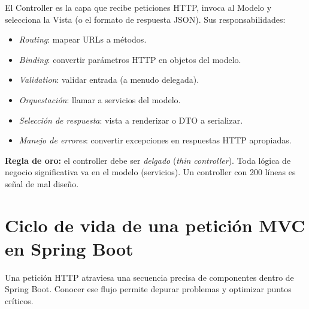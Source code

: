 El Controller es la capa que recibe peticiones HTTP, invoca al Modelo
y selecciona la Vista (o el formato de respuesta JSON). Sus
responsabilidades:

\begin{itemize}
\item \emph{Routing}: mapear URLs a métodos.
\item \emph{Binding}: convertir parámetros HTTP en objetos del modelo.
\item \emph{Validation}: validar entrada (a menudo delegada).
\item \emph{Orquestación}: llamar a servicios del modelo.
\item \emph{Selección de respuesta}: vista a renderizar o DTO a
serializar.
\item \emph{Manejo de errores}: convertir excepciones en respuestas
HTTP apropiadas.
\end{itemize}

\textbf{Regla de oro:} el controller debe ser \emph{delgado} (\emph{thin
controller}). Toda lógica de negocio significativa va en el modelo
(servicios). Un controller con 200 líneas es señal de mal diseño.

\section{Ciclo de vida de una petición MVC en Spring Boot}

Una petición HTTP atraviesa una secuencia precisa de
componentes dentro de Spring Boot. Conocer ese flujo permite
depurar problemas y optimizar puntos críticos.


